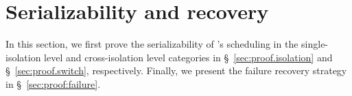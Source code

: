 \section{Serializability and recovery}\label{sec:correctness}




In this section, we first prove the serializability of \sysname's scheduling in the single-isolation level and cross-isolation level categories in \S~\ref{sec:proof.isolation} and \S~\ref{sec:proof.switch}, respectively. Finally, we present the failure recovery strategy in \S~\ref{sec:proof:failure}. 

